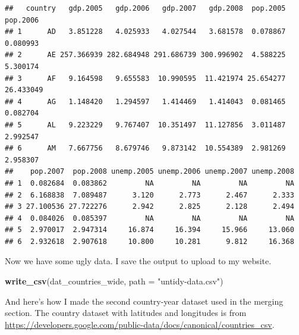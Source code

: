 \documentclass[
  12pt,
  oneside,openany]{book}
\newenvironment{Shaded}{\begin{snugshade}}{\end{snugshade}}
\newcommand{\DataTypeTok}[1]{\textcolor[rgb]{0.13,0.29,0.53}{#1}}
\newcommand{\DecValTok}[1]{\textcolor[rgb]{0.00,0.00,0.81}{#1}}
\newcommand{\KeywordTok}[1]{\textcolor[rgb]{0.13,0.29,0.53}{\textbf{#1}}}
\newcommand{\NormalTok}[1]{#1}
\newcommand{\OperatorTok}[1]{\textcolor[rgb]{0.81,0.36,0.00}{\textbf{#1}}}
\newcommand{\StringTok}[1]{\textcolor[rgb]{0.31,0.60,0.02}{#1}}
\begin{document}
\begin{verbatim}
##   country   gdp.2005   gdp.2006   gdp.2007   gdp.2008  pop.2005  pop.2006
## 1      AD   3.851228   4.025933   4.027544   3.681578  0.078867  0.080993
## 2      AE 257.366939 282.684948 291.686739 300.996902  4.588225  5.300174
## 3      AF   9.164598   9.655583  10.990595  11.421974 25.654277 26.433049
## 4      AG   1.148420   1.294597   1.414469   1.414043  0.081465  0.082704
## 5      AL   9.223229   9.767407  10.351497  11.127856  3.011487  2.992547
## 6      AM   7.667756   8.679746   9.873142  10.554389  2.981269  2.958307
##    pop.2007  pop.2008 unemp.2005 unemp.2006 unemp.2007 unemp.2008
## 1  0.082684  0.083862         NA         NA         NA         NA
## 2  6.168838  7.089487      3.120      2.773      2.467      2.333
## 3 27.100536 27.722276      2.942      2.825      2.128      2.494
## 4  0.084026  0.085397         NA         NA         NA         NA
## 5  2.970017  2.947314     16.874     16.394     15.966     13.060
## 6  2.932618  2.907618     10.800     10.281      9.812     16.368
\end{verbatim}

Now we have some ugly data. I save the output to upload to my website.

\begin{Shaded}
\begin{Highlighting}[]
\KeywordTok{write\_csv}\NormalTok{(dat\_countries\_wide, }\DataTypeTok{path =} \StringTok{"untidy{-}data.csv"}\NormalTok{)}
\end{Highlighting}
\end{Shaded}

And here's how I made the second country-year dataset used in the merging section. The country dataset with latitudes and longitudes is from \url{https://developers.google.com/public-data/docs/canonical/countries_csv}.

\begin{Shaded}
\end{Shaded}
\end{document}
